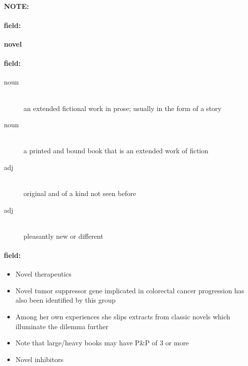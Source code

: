 \documentclass[12pt]{article}
\newenvironment{note}{\paragraph{NOTE:}}{}
\newenvironment{field}{\paragraph{field:}}{}
\begin{document}
\begin{note}
\begin{field}
\textbf{\large novel}
\end{field}


\begin{field}
\begin{description}
\item[noun] \hfill \\ 
an extended fictional work in prose; usually in the form of a story

\item[noun] \hfill \\ 
a printed and bound book that is an extended work of fiction

\item[adj] \hfill \\ 
original and of a kind not seen before

\item[adj] \hfill \\ 
pleasantly new or different

\end{description}
\end{field}

\begin{field}
\begin{itemize}
\item Novel therapeutics
\item Novel tumor suppressor gene implicated in colorectal cancer progression has also been identified by this group
\item Among her own experiences she slips extracts from classic novels which illuminate the dilemma further
\item Note that large/heavy books may have P&P of  3 or more
\item Novel inhibitors
\end{itemize}
\end{field}
\end{note}
\end{document}
